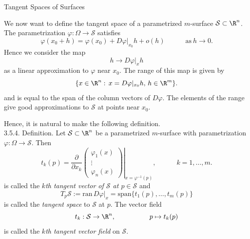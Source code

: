 \documentclass[smaller,hyperref={CJKbookmarks=true}]{beamer}
\begin{document}
\begin{frame}{Tangent Spaces of Surfaces}
\begin{spacing}{1.05}
We now want to define the tangent space of a parametrized $m$-surface $\mathcal{S}\subset\R^n$. The parametrization $\varphi:\Omega\to\mathcal{S}$ satisfies
\[\varphi(x_0+h)=\varphi(x_0)+D\varphi|_{x_0}h+o(h)
\qquad\quad\text{as}~h\to0.\]
Hence we consider the map
\[h\to D\varphi|_xh\]
as a linear approximation to $\varphi$ near $x_0$. The range of this map is given by
\[\{x\in\R^n:\,x=D\varphi|_{x_0}h,\,h\in\R^m\}.\]
and is equal to the span of the column vectors of $D\varphi$. The elements of the range give good approximations to $\mathcal{S}$ at points near $x_0$.
\end{spacing}
\newpage
\begin{spacing}{0.9}
Hence, it is natural to make the following definition.\\[5pt]
\alert{3.5.4. Definition.} Let $\mathcal{S}\subset\R^n$ be a parametrized $m$-surface with parametrization $\varphi:\Omega\to\mathcal{S}$. Then
\[t_k(p)=\frac{\partial}{\partial x_k}\left.\begin{pmatrix}
      \varphi_1(x) \\
      \vdots \\
      \varphi_n(x)
    \end{pmatrix}\right|_{x=\varphi^{-1}(p)},\qquad\quad
    k=1,\ldots,m.\]
is called the \emph{$k$th tangent vector of $\mathcal{S}$ at $p\in\mathcal{S}$} and
\[T_p\mathcal{S}:=\text{ran}\,D\varphi|_x
=\text{span}\{t_1(p),\ldots,t_m(p)\}\]
is called the \emph{tangent space} to $\mathcal{S}$ at $p$. The vector field
\[t_k:\mathcal{S}\to\R^n,\qquad\qquad\quad
p\mapsto t_k(p)\]
is called the \emph{$k$th tangent vector field} on $\mathcal{S}$.
\end{spacing}
\end{frame}
\end{document}

